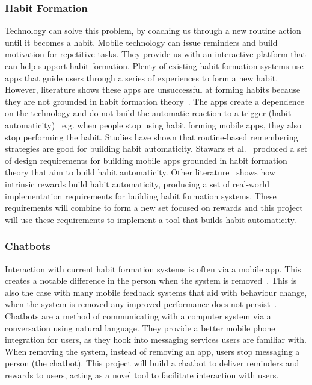 \subsubsection*{Habit Formation}
Technology can solve this problem, by coaching us through a new routine action until it becomes a habit. Mobile technology can issue reminders and build motivation for repetitive tasks. They provide us with an interactive platform that can help support habit formation. Plenty of existing habit formation systems use apps that guide users through a series of experiences to form a new habit. However, literature shows these apps are unsuccessful at forming habits because they are not grounded in habit formation theory~\cite{article_beyond_self_tracking_designing_apps, article_apps_of_steel}. The apps create a dependence on the technology and do not build the automatic reaction to a trigger (habit automaticity)~\cite{article_dont_kick_habit} e.g. when people stop using habit forming mobile apps, they also stop performing the habit.\newline
\newline
Studies have shown that routine-based remembering strategies are good for building habit automaticity. Stawarz et al.~\cite{article_dont_forget_your_pill} produced a set of design requirements for building mobile apps grounded in habit formation theory that aim to build habit automaticity. Other literature~\cite{article_taxonomy_motivational_affordances_meaningful} shows how intrinsic rewards build habit automaticity, producing a set of real-world implementation requirements for building habit formation systems. These requirements will combine to form a new set focused on rewards and this project will use these requirements to implement a tool that builds habit automaticity.

\subsubsection*{Chatbots}
Interaction with current habit formation systems is often via a mobile app. This creates a notable difference in the person when the system is removed~\cite{article_my_phone_is_part_of_my_soul}. This is also the case with many mobile feedback systems that aid with behaviour change, when the system is removed any improved performance does not persist~\cite{article_dont_kick_habit, article_realtime_feedback_improving_medication_taking}.\newline
\newline
Chatbots are a method of communicating with a computer system via a conversation using natural language. They provide a better mobile phone integration for users, as they hook into messaging services users are familiar with. When removing the system, instead of removing an app, users stop messaging a person (the chatbot). This project will build a chatbot to deliver reminders and rewards to users, acting as a novel tool to facilitate interaction with users.

